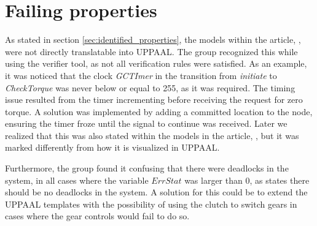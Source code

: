 \section{Failing properties}

As stated in section \ref{sec:identified_properties}, the models within the article, , were not directly translatable into UPPAAL. The group recognized this while using the verifier tool, as not all verification rules were satisfied. As an example, it was noticed that the clock \textit{GCTImer} in the transition from \textit{initiate} to \textit{CheckTorque} was never below or equal to 255, as it was required. The timing issue resulted from the timer incrementing before receiving the request for zero torque. A solution was implemented by adding a committed location to the node, ensuring the timer froze until the signal to continue was received. Later we realized that this was also stated within the models in the article, , but it was marked differently from how it is visualized in UPPAAL.

Furthermore, the group found it confusing that there were deadlocks in the system, in all cases where the variable $ErrStat$ was larger than 0, as \citeauthor{gearcontrol} states there should be no deadlocks in the system. A solution for this could be to extend the UPPAAL templates with the possibility of using the clutch to switch gears in cases where the gear controls would fail to do so.